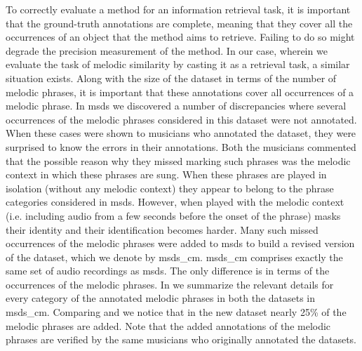 {{{To correctly evaluate a method for an information retrieval task, it is important that the ground-truth annotations are complete, meaning that they cover all the occurrences of an object that the method aims to retrieve. Failing to do so might degrade the precision measurement of the method. In our case, wherein we evaluate the task of melodic similarity by casting it as a retrieval task, a similar situation exists. Along with the size of the dataset in terms of the number of melodic phrases, it is important that these annotations cover all occurrences of a melodic phrase. In \acrshort{msds} we discovered a number of discrepancies where several occurrences of the melodic phrases considered in this dataset were not annotated. When these cases were shown to musicians who annotated the dataset, they were surprised to know the errors in their annotations. Both the musicians commented that the possible reason why they missed marking such phrases was the melodic context in which these phrases are sung. When these phrases are played in isolation (without any melodic context) they appear to belong to the phrase categories considered in \acrshort{msds}. However, when played with the melodic context (i.e. including audio from a few seconds before the onset of the phrase) masks their identity and their identification becomes harder. Many such missed occurrences of the melodic phrases were added to \acrshort{msds} to build a revised version of the dataset, which we denote by \acrshort{msds_cm}. \acrshort{msds_cm} comprises exactly the same set of audio recordings as \acrshort{msds}. The only difference is in terms of the occurrences of the melodic phrases. In   we summarize the relevant details for every category of the annotated melodic phrases in both the datasets in \acrshort{msds_cm}. Comparing  and  we notice that in the new dataset nearly 25\% of the melodic phrases are added. Note that the added annotations of the melodic phrases are verified by the same musicians who originally annotated the datasets.


}}}
